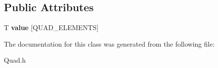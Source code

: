 \subsection*{Public Attributes}
\begin{DoxyCompactItemize}
\item 
\hypertarget{classfirestep_1_1_quad_aba9ca325c5769b788bfe2fe0cc592f3f}{T {\bfseries value} \mbox{[}Q\+U\+A\+D\+\_\+\+E\+L\+E\+M\+E\+N\+T\+S\mbox{]}}\label{classfirestep_1_1_quad_aba9ca325c5769b788bfe2fe0cc592f3f}

\end{DoxyCompactItemize}


The documentation for this class was generated from the following file\+:\begin{DoxyCompactItemize}
\item 
Quad.\+h\end{DoxyCompactItemize}
